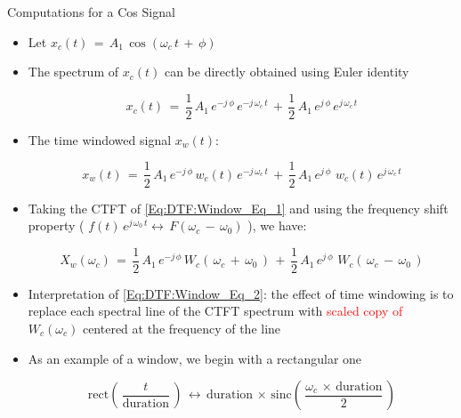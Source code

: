 \begin{frame}[t,allowframebreaks]{Computations for a Cos Signal}

\begin{itemize}

\item Let $x_c(t) \, = \, A_1 \, \cos(\omega_c \, t \, + \, \phi)$

\item The spectrum of $x_c(t)$ can be directly obtained using Euler identity

\begin{equation}
    x_c(t) \, = \, \displaystyle\frac{1}{2} \, A_1 \, e^{-j \, \phi} \, e^{-j \, \omega_c \, t} \, + \, \displaystyle\frac{1}{2} \, A_1 \, e^{j \, \phi} \, e^{j \, \omega_c \, t}
\end{equation}


\item The time windowed signal $x_w(t)$:

\begin{equation}
 x_w(t) \, = \, \displaystyle\frac{1}{2} \, A_1 \, e^{-j \, \phi} \, w_c(t) \, e^{-j \, \omega_c \, t} \, + \, \displaystyle\frac{1}{2} \, A_1 \, e^{j \, \phi} \, \, w_c(t) \, e^{j \, \omega_c \, t} 
 \label{Eq:DTF:Window_Eq_1}
\end{equation}

\item Taking the CTFT of \autoref{Eq:DTF:Window_Eq_1} and using the frequency shift property \cite{signal_processing_Lathi} ( $f(t) \, e^{j \, \omega_0 \, t} \leftrightarrow \, F(\omega_c \, - \, \omega_0)$ ), we have:

\begin{equation}
   X_w(\omega_c) \, = \, \displaystyle\frac{1}{2} \, A_1 \, e^{-j \, \phi} \, W_c(\, \omega_c \, + \, \omega_0 \,)  \, + \, \displaystyle\frac{1}{2} \, A_1 \, e^{j \, \phi} \, \, W_c(\, \omega_c \, - \, \omega_0 \,)
 \label{Eq:DTF:Window_Eq_2}  
\end{equation}

\item Interpretation of \autoref{Eq:DTF:Window_Eq_2}: the effect of time windowing is to replace each spectral line of the CTFT spectrum with \textcolor{red}{scaled copy of}  $W_c(\omega_c)$ centered at the frequency  of the line

\item As an example of a window, we begin with a rectangular one 

\begin{equation}
\text{rect} \left(\, \displaystyle\frac{t}{\text{duration}} \,\right) \, \leftrightarrow \, \text{duration} \, \times \, \text{sinc} \left(\,\displaystyle\frac{\omega_c \, \times \, \text{duration}}{2} \, \right)    
\end{equation}

\end{itemize}

\end{frame}


